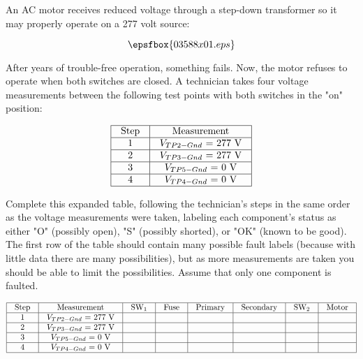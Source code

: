 

An AC motor receives reduced voltage through a step-down transformer so it may properly operate on a 277 volt source:

$$\epsfbox{03588x01.eps}$$

After years of trouble-free operation, something fails.  Now, the motor refuses to operate when both switches are closed.  A technician takes four voltage measurements between the following test points with both switches in the "on" position:


$$\vbox{\offinterlineskip
\halign{\strut
\vrule \quad\hfil # \ \hfil & 
\vrule \quad\hfil # \ \hfil \vrule \cr
\noalign{\hrule}
%
Step & Measurement \cr
%
\noalign{\hrule}
%
1 & $V_{TP2-Gnd}$ = 277 V \cr
%
\noalign{\hrule}
%
2 & $V_{TP3-Gnd}$ = 277 V \cr
%
\noalign{\hrule}
%
3 & $V_{TP5-Gnd}$ = 0 V \cr
%
\noalign{\hrule}
%
4 & $V_{TP4-Gnd}$ = 0 V \cr
%
\noalign{\hrule}
} %
}$$ %

Complete this expanded table, following the technician's steps in the same order as the voltage measurements were taken, labeling each component's status as either "O" (possibly open), "S" (possibly shorted), or "OK" (known to be good).  The first row of the table should contain many possible fault labels (because with little data there are many possibilities), but as more measurements are taken you should be able to limit the possibilities.  Assume that only one component is faulted.


$$\vbox{\offinterlineskip
\halign{\strut
\vrule \quad\hfil # \ \hfil & 
\vrule \quad\hfil # \ \hfil & 
\vrule \quad\hfil # \ \hfil & 
\vrule \quad\hfil # \ \hfil & 
\vrule \quad\hfil # \ \hfil & 
\vrule \quad\hfil # \ \hfil & 
\vrule \quad\hfil # \ \hfil & 
\vrule \quad\hfil # \ \hfil \vrule \cr
\noalign{\hrule}
%
Step & Measurement & SW$_{1}$ & Fuse & Primary & Secondary & SW$_{2}$ & Motor \cr
%
\noalign{\hrule}
%
1 & $V_{TP2-Gnd}$ = 277 V &  &  &  &  &  &  \cr
%
\noalign{\hrule}
%
2 & $V_{TP3-Gnd}$ = 277 V &  &  &  &  &  &  \cr
%
\noalign{\hrule}
%
3 & $V_{TP5-Gnd}$ = 0 V &  &  &  &  &  &  \cr
%
\noalign{\hrule}
%
4 & $V_{TP4-Gnd}$ = 0 V &  &  &  &  &  &  \cr
%
\noalign{\hrule}
} %
}$$ %

